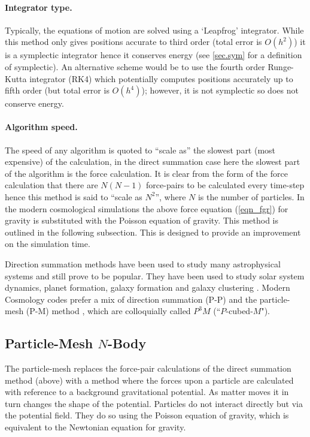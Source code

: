 \paragraph{Integrator type.} Typically, the equations of motion are solved using a `Leapfrog' integrator. While this method only gives positions accurate to third order (total error is $ O(h^2)$) it is a symplectic integrator hence it conserves energy (see \ref{sec.sym} for a definition of symplectic). An alternative scheme would be to use the fourth order Runge-Kutta integrator (RK4) which potentially computes positions accurately up to fifth order (but total error is $ O(h^4)$); however, it is not symplectic so does not conserve energy. \citep{bib_nr}

\paragraph{Algorithm speed.} The speed of any algorithm is quoted to ``scale as'' the slowest part (most expensive) of the calculation, in the direct summation case here the slowest part of the algorithm is the force calculation. It is clear from the form of the force calculation that there are $N (N-1)$ force-pairs to be calculated every time-step hence this method is said to ``scale as $N^2$'', where $N$ is the number of particles. In the modern cosmological simulations the above force equation (\ref{eqn_fgr}) for gravity is substituted with the Poisson equation of gravity. This method is outlined in the following subsection. This is designed to provide an improvement on the simulation time.

Direction summation methods have been used to study many astrophysical systems and still prove to be popular. They have been used to study solar system dynamics, planet formation, galaxy formation and galaxy clustering \citep{bib_quin, bib_aar}. Modern Cosmology codes prefer a mix of direction summation (P-P) and the particle-mesh (P-M) method \citep{bib_bert, bib_hmpc}, which are colloquially called $P^3 M$ (``$P$-cubed-$M$").

\subsection{Particle-Mesh $N$-Body}
\label{sec.mesh}
The particle-mesh replaces the force-pair calculations of the direct summation method (above) with a method where the forces upon a particle are calculated with reference to a background gravitational potential. As matter moves it in turn changes the shape of the potential. Particles do not interact directly but via the potential field. They do so using the Poisson equation of gravity, which is equivalent to the Newtonian equation for gravity.

